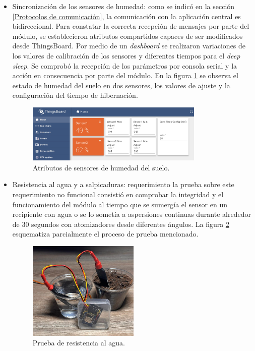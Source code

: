 \begin{itemize}
\item Sincronización de los sensores de humedad: como se indicó en la sección \ref{Protocolos de comunicación}, la comunicación con la aplicación central es bidireccional. Para constatar la correcta recepción de mensajes por parte del módulo, se establecieron atributos compartidos capaces de ser modificados desde ThingsBoard. Por medio de  un \textit{dashboard} se realizaron variaciones de los valores de calibración de los sensores y diferentes tiempos para el \textit{deep sleep}.
Se comprobó la recepción de los parámetros por consola serial y la acción en consecuencia por parte del módulo.
En la figura \ref{fig:soil_calib} se observa el estado de humedad del suelo en dos sensores, los valores de ajuste y la configuración del tiempo de hibernación.

\begin{figure}[!h]
	\centering
	\includegraphics[width=0.80\textwidth]{./Figures/chapter4/soil_calib.jpg}
	\caption[Atributos de sensores de humedad del suelo]{Atributos de sensores de humedad del suelo.}
	\label{fig:soil_calib}
\end{figure}

\item Resistencia al agua y a salpicaduras: requerimiento la prueba sobre este requerimiento no funcional consistió en comprobar la integridad y el funcionamiento del módulo al tiempo que se sumergía el sensor en un recipiente con agua o se lo sometía a aspersiones continuas durante alrededor de 30 segundos con atomizadores desde diferentes ángulos.
La figura \ref{fig:soil_test} esquematiza parcialmente el proceso de prueba mencionado.

\begin{figure}[h]
	\centering
	\includegraphics[width=0.50\textwidth]{./Figures/chapter4/soil_testing3.jpg}
	\caption[Prueba de resistencia al agua]{Prueba de resistencia al agua.}
	\label{fig:soil_test}
\end{figure}
  
\end{itemize}








